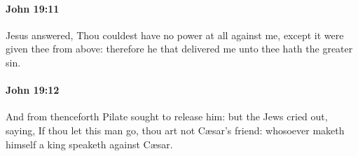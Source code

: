 		\paragraph{John 19:11} %
			\label{JOHN-19-11}

			Jesus answered, Thou couldest have no power at all against me, except it were given thee from above: therefore he that delivered me unto thee hath the greater sin.

			\begin{framed}
				\scriptsize
				\begin{compactdesc}
					\item[SBLG] 
				\end{compactdesc}
			\end{framed}

		\paragraph{John 19:12} %
			\label{JOHN-19-12}

			And from thenceforth Pilate sought to release him: but the Jews cried out, saying, If thou let this man go, thou art not Cæsar's friend: whosoever maketh himself a king speaketh against Cæsar.

